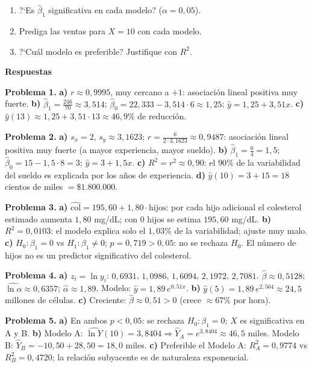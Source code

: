 \documentclass[10pt,letterpaper]{article}
\newcommand{\seccion}[1]{%
  \vspace{2pt}%
  \begin{tcolorbox}[enhanced,colback=white,colframe=black,arc=0pt,boxrule=0pt,
    leftrule=2pt,left=6pt,right=6pt,top=1pt,bottom=1pt]
    {\normalsize\bfseries\sffamily #1}
  \end{tcolorbox}%
  \vspace{1pt}%
}
\begin{document}
\begin{enumerate}[leftmargin=1.2cm, label=\textbf{\alph*)}, itemsep=2pt, topsep=2pt]
  \item ?`Es $\hat{\beta}_1$ significativa en cada modelo? ($\alpha=0{,}05$).
  \item Prediga las ventas para $X=10$ con cada modelo.
  \item ?`Cu\'al modelo es preferible? Justifique con $R^2$.
\end{enumerate}

\newpage

\seccion{Respuestas}

\small\sffamily
\textbf{Problema 1.}
\textbf{a)} $r\approx0{,}9995$, muy cercano a $+1$: asociaci\'on lineal positiva muy fuerte.
\textbf{b)} $\hat{\beta}_1=\frac{246}{70}\approx3{,}514$; $\hat{\beta}_0=22{,}333-3{,}514\cdot6\approx1{,}25$; $\hat{y}=1{,}25+3{,}51x$.
\textbf{c)} $\hat{y}(13)\approx1{,}25+3{,}51\cdot13\approx46{,}9\%$ de reducci\'on.

\medskip
\textbf{Problema 2.}
\textbf{a)} $s_x=2$, $s_y\approx3{,}1623$; $r=\frac{6}{2\cdot3{,}1623}\approx0{,}9487$: asociaci\'on lineal positiva muy fuerte (a mayor experiencia, mayor sueldo).
\textbf{b)} $\hat{\beta}_1=\frac{6}{4}=1{,}5$; $\hat{\beta}_0=15-1{,}5\cdot8=3$; $\hat{y}=3+1{,}5x$.
\textbf{c)} $R^2=r^2\approx0{,}90$: el $90\%$ de la variabilidad del sueldo es explicada por los a\~nos de experiencia.
\textbf{d)} $\hat{y}(10)=3+15=18$ cientos de miles $=\$1.800.000$.

\medskip
\textbf{Problema 3.}
\textbf{a)} $\widehat{\text{col}}=195{,}60+1{,}80\cdot\text{hijos}$: por cada hijo adicional el colesterol estimado aumenta $1{,}80$ mg/dL; con 0 hijos se estima $195{,}60$ mg/dL.
\textbf{b)} $R^2=0{,}0103$: el modelo explica solo el $1{,}03\%$ de la variabilidad; ajuste muy malo.
\textbf{c)} $H_0:\beta_1=0$ vs $H_1:\beta_1\neq0$; $p=0{,}719>0{,}05$: no se rechaza $H_0$. El n\'umero de hijos no es un predictor significativo del colesterol.

\medskip
\textbf{Problema 4.}
\textbf{a)} $z_i=\ln y_i$: $0{,}6931$, $1{,}0986$, $1{,}6094$, $2{,}1972$, $2{,}7081$. $\hat{\beta}\approx0{,}5128$; $\widehat{\ln\alpha}\approx0{,}6357$; $\hat{\alpha}\approx1{,}89$. Modelo: $\hat{y}=1{,}89\,e^{0{,}51x}$.
\textbf{b)} $\hat{y}(5)=1{,}89\,e^{2{,}564}\approx24{,}5$ millones de c\'elulas.
\textbf{c)} Creciente: $\hat{\beta}\approx0{,}51>0$ (crece $\approx67\%$ por hora).

\medskip
\textbf{Problema 5.}
\textbf{a)} En ambos $p<0{,}05$: se rechaza $H_0:\beta_1=0$; $X$ es significativa en A y B.
\textbf{b)} Modelo A: $\widehat{\ln Y}(10)=3{,}8404\Rightarrow\hat{Y}_A=e^{3{,}8404}\approx46{,}5$ miles. Modelo B: $\hat{Y}_B=-10{,}50+28{,}50=18{,}0$ miles.
\textbf{c)} Preferible el Modelo A: $R^2_A=0{,}9774$ vs $R^2_B=0{,}4720$; la relaci\'on subyacente es de naturaleza exponencial.
\end{document}
